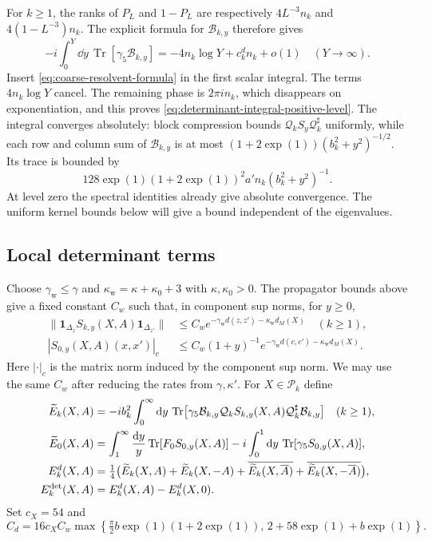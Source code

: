 For $k\ge1$, the ranks of $P_L$ and $1-P_L$ are respectively
$4L^{-3}n_k$ and $4(1-L^{-3})n_k$. The explicit formula for
$\mathcal B_{k,y}$ therefore gives
\[
 -i\int_0^Y\dd y\,\operatorname{Tr}[\gamma_5\mathcal B_{k,y}]
          =-4n_k\log Y+c_k^dn_k+o(1)
                  \quad(Y\to\infty).
\]
Insert \eqref{eq:coarse-resolvent-formula} in the first scalar
integral. The terms $4n_k\log Y$ cancel. The remaining phase is
$2\pi i n_k$, which disappears on exponentiation, and this proves
\eqref{eq:determinant-integral-positive-level}.
The integral converges absolutely: block compression bounds
$\mathcal Q_kS_y\mathcal Q_k^\sharp$ uniformly, while each row
and column sum of $\mathcal B_{k,y}$ is at most
$(1+2\exp(1))(b_k^2+y^2)^{-1/2}$. Its trace is bounded by
\[
 128\exp(1)(1+2\exp(1))^2a'n_k(b_k^2+y^2)^{-1}.
\]
At level zero the spectral identities already give absolute
convergence. The uniform kernel bounds below will give a bound
independent of the eigenvalues.

\subsection{Local determinant terms}\label{subsec:local-determinant-terms}

Choose $\gamma_{\mathrm w}\le\gamma$ and
$\kappa_{\mathrm w}=\kappa+\kappa_0+3$ with $\kappa,\kappa_0>0$.
The propagator bounds above give a fixed constant $C_w$ such that,
in component sup norms, for $y\ge0$,
\begin{align*}
 \|\mathbf1_{\Delta_z}S_{k,y}(X,A)\mathbf1_{\Delta_{z'}}\|
       &\le C_we^{-\gamma_{\mathrm w}d(z,z')
                                  -\kappa_{\mathrm w}d_M(X)}
                                                    \quad(k\ge1),\\
 |S_{0,y}(X,A)(x,x')|_c
       &\le C_w(1+y)^{-1}e^{-\gamma_{\mathrm w}d(c,c')
                                  -\kappa_{\mathrm w}d_M(X)}.
\end{align*}
Here $|\cdot|_c$ is the matrix norm induced by the component sup
norm. We may use the same $C_w$ after reducing the rates from
$\gamma,\kappa'$.
For $X\in\mathcal P_k$ define
\begin{align}
 \widetilde E_k(X,A)
    &=-ib_k^2\int_0^\infty\mathrm d y\,
       \operatorname{Tr}\bigl[\gamma_5\mathcal B_{k,y}\mathcal Q_k
           S_{k,y}(X,A)\mathcal Q_k^\sharp\mathcal B_{k,y}\bigr]
                   \quad(k\ge1),\label{eq:local-determinant-definition}\\
 \widetilde E_0(X,A)
    &=\int_1^\infty\frac{\mathrm d y}{y}
                     \operatorname{Tr}[F_0S_{0,y}(X,A)]
       -i\int_0^1\mathrm d y\,\operatorname{Tr}[\gamma_5S_{0,y}(X,A)],\notag\\
 E_k^d(X,A)&=\tfrac14\bigl(\widetilde E_k(X,A)
       +\widetilde E_k(X,-A)
       +\overline{\widetilde E_k(X,\overline A)}
       +\overline{\widetilde E_k(X,-\overline A)}\bigr),\notag\\
 E_k^{\mathrm{det}}(X,A)&=E_k^d(X,A)-E_k^d(X,0).\notag
\end{align}
Set $c_X=54$ and
\[
 C_d=16c_XC_w\max\left\{\tfrac\pi2b\exp(1)(1+2\exp(1)),\,
                                  2+58\exp(1)+b\exp(1)\right\}.
\]

